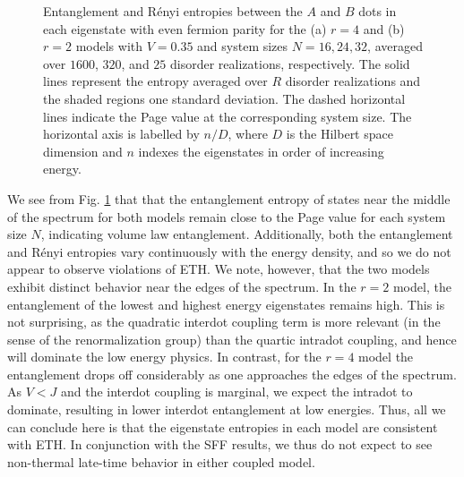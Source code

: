 \documentclass[reprint, floatfix,eqsecnum,superscriptaddress,preprint,nofootinbib,onecolumn,amsmath,amssymb,aps,prb]{revtex4-2}
\begin{document}
\begin{figure}%
  \caption{Entanglement and R\'enyi entropies between the $A$ and $B$ dots in each eigenstate with even fermion parity for the (a) $r=4$ and (b) $r=2$ models with $V=0.35$ and system sizes $N=16,24,32$, averaged over $1600$, $320$, and $25$ disorder realizations, respectively. %
  The solid lines represent the entropy averaged over $R$ disorder realizations and the shaded regions one standard deviation. The dashed horizontal lines indicate the Page value at the corresponding system size. 
  The horizontal axis is labelled by $n/D$, where $D$ is the Hilbert space dimension and $n$ indexes the eigenstates in order of increasing energy. \label{fig:estate-entanglement} }
\end{figure}

We see from Fig. \ref{fig:estate-entanglement} that that the entanglement entropy of states near the middle of the spectrum for both models remain close to the Page value for each system size $N$, indicating volume law entanglement. Additionally, both the entanglement and R\'enyi entropies vary continuously with the energy density, and so we do not appear to observe violations of ETH. %
We note, however, that the two models exhibit distinct behavior near the edges of the spectrum.
In the $r=2$ model, the entanglement of the lowest and highest energy eigenstates remains high. %
This is not surprising, as the quadratic interdot coupling term is more relevant (in the sense of the renormalization group) than the quartic intradot coupling, and hence will dominate the low energy physics. 
In contrast, for the $r=4$ model the entanglement drops off considerably as one approaches the edges of the spectrum. 
As $V<J$ and the interdot coupling is marginal, we expect the intradot to dominate, resulting in lower interdot entanglement at low energies.
Thus, all we can conclude here is that the eigenstate entropies in each model are consistent with ETH. In conjunction with the SFF results, we thus do not expect to see non-thermal late-time behavior in either coupled model.
\end{document}
